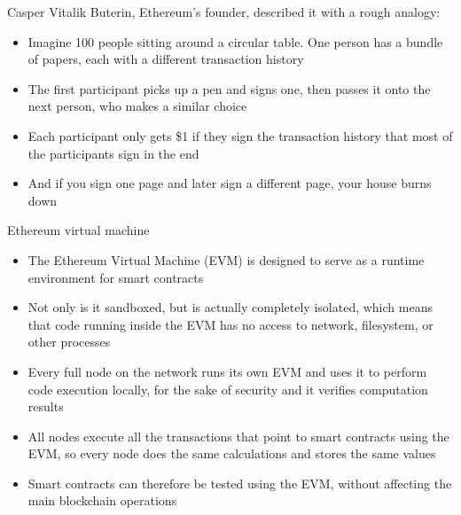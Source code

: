 \documentclass[11pt]{beamer}
\begin{document}


\begin{frame}{Casper}
	Vitalik Buterin, Ethereum's founder, described it with a rough analogy:
	\begin{itemize}
		\item Imagine 100 people sitting around a circular table. One person has a bundle of papers, each with a different transaction history
		\item The first participant picks up a pen and signs one, then passes it onto the next person, who makes a similar choice
		\item Each participant only gets \$1 if they sign the transaction history that most of the participants sign in the end
		\item And if you sign one page and later sign a different page, your house burns down
	\end{itemize}
\end{frame}


\begin{frame}{Ethereum virtual machine}
	\begin{itemize}
		\item The Ethereum Virtual Machine (EVM) is designed to serve as a runtime environment for smart contracts
		\item Not only is it sandboxed, but is actually completely isolated, which means that code running inside the EVM has no access to network, filesystem, or other processes
		\item Every full node on the network runs its own EVM and uses it to perform code execution locally, for the sake of security and it verifies computation results
		\item All nodes execute all the transactions that point to smart contracts using the EVM, so every node does the same calculations and stores the same values
		\item Smart contracts can therefore be tested using the EVM, without affecting the main blockchain operations
	\end{itemize}
\end{frame}

\end{document}
